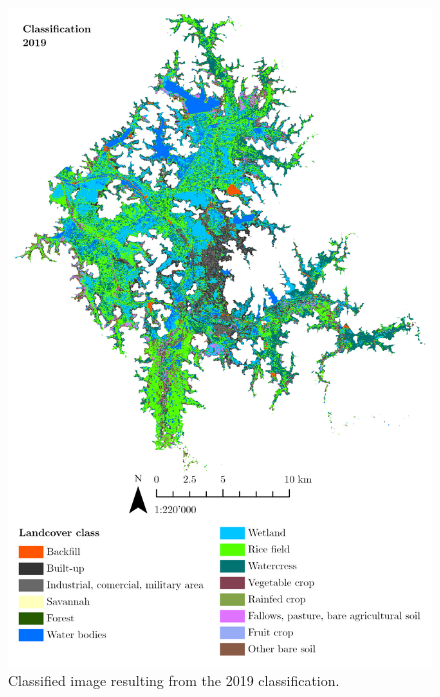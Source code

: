 \begin{figure}[H]
    \centering
    \includegraphics[width = 15cm]{figures/classi2019.png}
    \caption{Classified image resulting from the 2019 classification.}
    \label{}
\end{figure}

